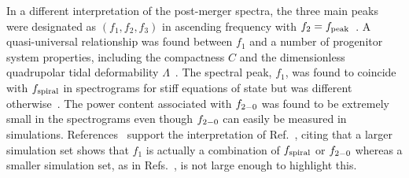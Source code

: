 \documentclass[../Thesis.tex]{subfiles}
\begin{document}
    
    In a different interpretation of the post-merger spectra, the three main peaks were designated as $(f_1, f_2, f_3)$ in ascending frequency with $f_2 = f_{\mathrm{peak}}$~\cite{Takami2014,Takami2015,Rezzolla2016}.
    A quasi-universal relationship was found between $f_1$ and a number of progenitor system properties, including the compactness $C$ and the dimensionless quadrupolar tidal deformability $\Lambda$~\cite{Takami2015}.
    The spectral peak, $f_1$, was found to coincide with $f_{\mathrm{spiral}}$ in spectrograms for stiff equations of state but was different otherwise~\cite{Rezzolla2016}.
    The power content associated with $f_{2-0}$ was found to be extremely small in the spectrograms  even though $f_{2-0}$ can easily be measured in simulations.
    References~\cite{Bauswein2019a,Vretinaris2019} support the interpretation of Ref.~\cite{Bauswein2015}, citing that a larger simulation set shows that $f_1$ is actually a combination of $f_{\mathrm{spiral}}$ or $f_{2-0}$ whereas a smaller simulation set, as in Refs.~\cite{Takami2014,Takami2015,Rezzolla2016}, is not large enough to highlight this.
\par
    
    
    
\end{document}
